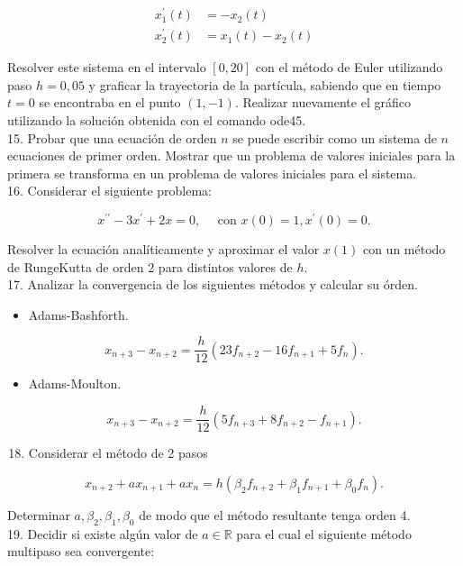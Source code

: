 \documentclass[10pt]{book}
\begin{document}
$$
\begin{aligned}
x_{1}^{\prime}(t) & =-x_{2}(t) \\
x_{2}^{\prime}(t) & =x_{1}(t)-x_{2}(t)
\end{aligned}
$$

Resolver este sistema en el intervalo $[0,20]$ con el método de Euler utilizando paso $h=0,05$ y graficar la trayectoria de la partícula, sabiendo que en tiempo $t=0$ se encontraba en el punto $(1,-1)$. Realizar nuevamente el gráfico utilizando la solución obtenida con el comando ode45.\\
15. Probar que una ecuación de orden $n$ se puede escribir como un sistema de $n$ ecuaciones de primer orden. Mostrar que un problema de valores iniciales para la primera se transforma en un problema de valores iniciales para el sistema.\\
16. Considerar el siguiente problema:

$$
x^{\prime \prime}-3 x^{\prime}+2 x=0, \quad \text { con } x(0)=1, x^{\prime}(0)=0 .
$$

Resolver la ecuación analíticamente y aproximar el valor $x(1)$ con un método de RungeKutta de orden 2 para distintos valores de $h$.\\
17. Analizar la convergencia de los siguientes métodos y calcular su órden.

\begin{itemize}
  \item Adams-Bashforth.
\end{itemize}

$$
x_{n+3}-x_{n+2}=\frac{h}{12}\left(23 f_{n+2}-16 f_{n+1}+5 f_{n}\right) .
$$

\begin{itemize}
  \item Adams-Moulton.
\end{itemize}

$$
x_{n+3}-x_{n+2}=\frac{h}{12}\left(5 f_{n+3}+8 f_{n+2}-f_{n+1}\right) .
$$

\begin{enumerate}
  \setcounter{enumi}{17}
  \item Considerar el método de 2 pasos
\end{enumerate}

$$
x_{n+2}+a x_{n+1}+a x_{n}=h\left(\beta_{2} f_{n+2}+\beta_{1} f_{n+1}+\beta_{0} f_{n}\right) .
$$

Determinar $a, \beta_{2}, \beta_{1}, \beta_{0}$ de modo que el método resultante tenga orden 4.\\
19. Decidir si existe algún valor de $a \in \mathbb{R}$ para el cual el siguiente método multipaso sea convergente:
\end{document}
